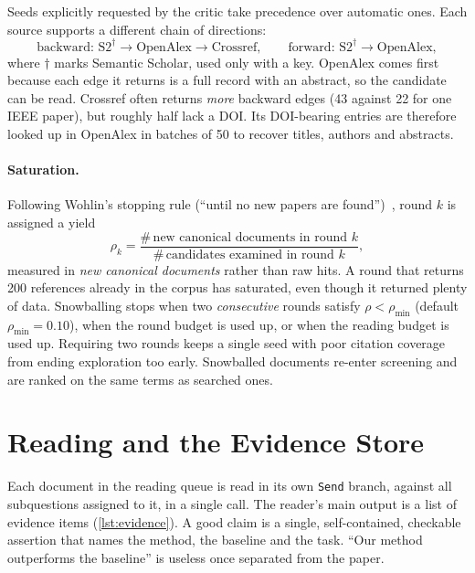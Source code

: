 \documentclass{article}
\newcommand{\code}[1]{\texttt{#1}}
\begin{document}
Seeds explicitly requested by the critic take precedence over automatic
ones. Each source supports a different chain of directions:
\[
\text{backward: } \text{S2}^{\dagger} \to \text{OpenAlex} \to \text{Crossref},
\qquad
\text{forward: } \text{S2}^{\dagger} \to \text{OpenAlex},
\]
where $\dagger$ marks Semantic Scholar, used only with a key. OpenAlex
comes first because each edge it returns is a full record with an
abstract, so the candidate can be read. Crossref often returns
\emph{more} backward edges (43 against 22 for one IEEE paper), but roughly
half lack a DOI. Its DOI-bearing entries are therefore looked up in
OpenAlex in batches of 50 to recover titles, authors and abstracts.

\paragraph{Saturation.} Following Wohlin's stopping rule (``until no new
papers are found'')~\citep{wohlin2014guidelines}, round $k$ is assigned a
yield
\begin{equation}
\rho_k = \frac{\#\,\text{new canonical documents in round } k}
              {\#\,\text{candidates examined in round } k},
\end{equation}
measured in \emph{new canonical documents} rather than raw hits. A round
that returns 200 references already in the corpus has saturated, even
though it returned plenty of data. Snowballing stops when two
\emph{consecutive} rounds satisfy $\rho < \rho_{\min}$ (default
$\rho_{\min}=0.10$), when the round budget is used up, or when the reading
budget is used up. Requiring two rounds keeps a single seed with poor
citation coverage from ending exploration too early. Snowballed documents
re-enter screening and are ranked on the same terms as searched ones.

\section{Reading and the Evidence Store}
\label{sec:evidence}

Each document in the reading queue is read in its own \code{Send} branch,
against all subquestions assigned to it, in a single call. The reader's
main output is a list of evidence items (\cref{lst:evidence}). A good claim
is a single, self-contained, checkable assertion that names the method, the
baseline and the task. ``Our method outperforms the baseline'' is useless
once separated from the paper.
\end{document}
